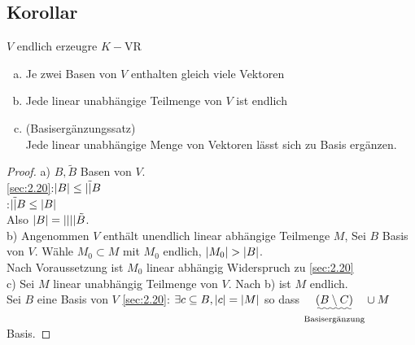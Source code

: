 \subsection{Korollar}\label{sec:2.21}
$V$ endlich erzeugre $K-$VR
\begin{enumerate}[a)]
\item Je zwei Basen von $V$ enthalten gleich viele Vektoren
\item Jede linear unabhängige Teilmenge von $V$ ist endlich
\item (Basisergänzungssatz)\\
Jede linear unabhängige Menge von Vektoren lässt sich zu Basis ergänzen.
\end{enumerate}
\begin{proof}
a) $B, \tilde{B}$ Basen von $V$.\\
\ref{sec:2.20}:$\lvert B \rvert \leq \lvert \tilde \rvert{B}$\\
\phantom{\ref{sec:2.20}}:$\lvert \tilde \rvert{B} \leq \lvert B \rvert$\\
Also $\lvert B \rvert = \lvert \lvert \rvert \rvert\tilde{B}$.\\
b) Angenommen $V$ enthält unendlich linear abhängige Teilmenge $M$, Sei $B$ Basis von $V$. Wähle $M_0 \subset M$ mit $M_0$ endlich, $\lvert M_0 \rvert > \lvert B \rvert$.\\
Nach Voraussetzung ist $M_0$ linear abhängig Widerspruch zu \ref{sec:2.20}\\
c) Sei $M$ linear unabhängig Teilmenge von $V$. Nach b) ist $M$ endlich.\\
Sei $B$ eine Basis von $V$ \ref{sec:2.20}: $\exists c \subseteq B, \lvert c \rvert = \lvert M \rvert$ so dass $\underset{\text{Basisergänzung}}{\uwave{(B \setminus C )}}\cup M$ Basis.
\end{proof}
